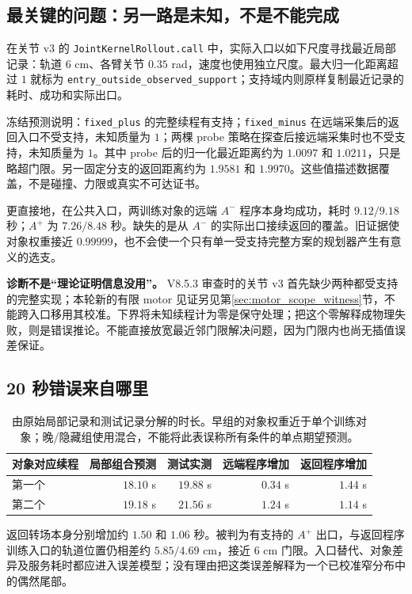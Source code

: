 \documentclass[11pt,a4paper,fontset=fandol]{ctexart}
\theoremstyle{definition}
\theoremstyle{remark}\newtheorem{remark}[theorem]{说明}
\numberwithin{equation}{section}
\begin{document}
\subsection{最关键的问题：另一路是未知，不是不能完成}
在关节 v3 的 \texttt{JointKernelRollout.call} 中，实际入口以如下尺度寻找最近局部记录：轨道 $6$ cm、各臂关节 $0.35$ rad，速度也使用独立尺度。最大归一化距离超过 $1$ 就标为 \texttt{entry\_outside\_observed\_support}；支持域内则原样复制最近记录的耗时、成功和实际出口\cite{jointcode}。

冻结预测说明：\texttt{fixed\_plus} 的完整续程有支持；\texttt{fixed\_minus} 在远端采集后的返回入口不受支持，未知质量为 $1$；两棵 probe 策略在探查后接远端采集时也不受支持，未知质量为 $1$。其中 probe 后的归一化最近距离约为 $1.0097$ 和 $1.0211$，只是略超门限。另一固定分支的返回距离约为 $1.9581$ 和 $1.9970$。这些值描述数据覆盖，不是碰撞、力限或真实不可达证书。

更直接地，在公共入口，两训练对象的远端 $A^-$ 程序本身均成功，耗时 $9.12/9.18$ 秒；$A^+$ 为 $7.26/8.48$ 秒。缺失的是从 $A^-$ 的实际出口接续返回的覆盖。旧证据使对象权重接近 $0.99999$，也不会使一个只有单一受支持完整方案的规划器产生有意义的选支\cite{jointdata}。

\begin{corebox}
\textbf{诊断不是“理论证明信息没用”。}
V8.5.3 审查时的关节 v3 首先缺少两种都受支持的完整实现；本轮新的有限 motor 见证另见第\ref{sec:motor_scope_witness}节，不能跨入口移用其校准。下界将未知续程计为零是保守处理；把这个零解释成物理失败，则是错误推论。不能直接放宽最近邻门限解决问题，因为门限内也尚无插值误差保证。
\end{corebox}

\subsection{20 秒错误来自哪里}
\begin{table}[htbp]\centering\small
\begin{tabular}{lrrrr}\toprule
对象对应续程 & 局部组合预测 & 测试实测 & 远端程序增加 & 返回程序增加\\\midrule
第一个 & $18.10$ s & $19.88$ s & $0.34$ s & $1.44$ s\\
第二个 & $19.18$ s & $21.56$ s & $1.24$ s & $1.14$ s\\\bottomrule
\end{tabular}
\caption{由原始局部记录和测试记录分解的时长。早组的对象权重近于单个训练对象；晚/隐藏组使用混合，不能将此表误称所有条件的单点期望预测。}
\label{tab:timeaudit}
\end{table}
返回转场本身分别增加约 $1.50$ 和 $1.06$ 秒。被判为有支持的 $A^+$ 出口，与返回程序训练入口的轨道位置仍相差约 $5.85/4.69$ cm，接近 $6$ cm 门限。入口替代、对象差异及服务耗时都应进入误差模型；没有理由把这类误差解释为一个已校准窄分布中的偶然尾部\cite{jointcode,jointdata}。
\end{document}
